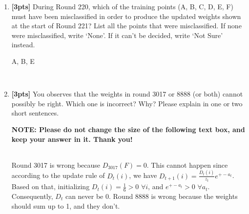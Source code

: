 \begin{enumerate}
\begin{enumerate}
    \item \textbf{[3pts]} During Round 220, which of the training points (A, B, C, D, E, F) must have been misclassified in order to produce the updated weights shown at the start of Round 221? List all the points that were misclassified.  If none were misclassified, write `None'. If it can't be decided, write `Not Sure' instead.

    \begin{tcolorbox}[fit,height=1cm, width=6cm, blank, borderline={1pt}{-2pt},nobeforeafter]
    \begin{center}\huge{A, B, E} \end{center}
    \end{tcolorbox}\\

    \item \textbf{[3pts]}  You observes that the weights in round 3017 or 8888 (or both) cannot possibly be right. Which one is incorrect? Why? Please explain in one or two short sentences.


    \textbf{NOTE: Please do not change the size of the following text box, and keep your answer in it. Thank you!} \\ \\
    \begin{tcolorbox}[fit,height=4cm, width=15cm, blank, borderline={1pt}{-2pt},nobeforeafter]
    \large
    Round 3017 is wrong because $D_{3017}(F)=0$. This cannot happen since according to the update rule of $D_t(i)$, we have $D_{t+1}(i)=\frac{D_t(i)}{z_t}e^{+-a_t}$. Based on that, initializing $D_t(i)=\frac{1}{6}>0$ $\forall i$, and $e^{+-a_t}>0$ $\forall a_t$. Consequently, $D_t$ can never be 0. Round 8888 is wrong because the weights should sum up to 1, and they don't.
    \end{tcolorbox} \\
    
    
    

\end{enumerate}
    
\end{enumerate}